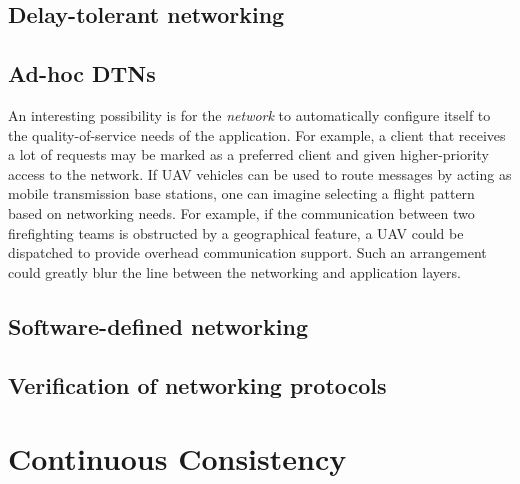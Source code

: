 \documentclass[]             %
{NASA}                       %
\theoremstyle{definition}
\begin{document}
\hypertarget{delay-tolerant-networking}{%
  \subsection{Delay-tolerant networking}\label{delay-tolerant-networking}}

\hypertarget{ad-hoc-dtns}{%
  \subsection{Ad-hoc DTNs}\label{ad-hoc-dtns}}

An interesting possibility is for the \emph{network} to automatically
configure itself to the quality-of-service needs of the application. For
example, a client that receives a lot of requests may be marked as a
preferred client and given higher-priority access to the network. If UAV
vehicles can be used to route messages by acting as mobile transmission
base stations, one can imagine selecting a flight pattern based on
networking needs. For example, if the communication between two
firefighting teams is obstructed by a geographical feature, a UAV could
be dispatched to provide overhead communication support. Such an
arrangement could greatly blur the line between the networking and
application layers.

\hypertarget{software-defined-networking}{%
  \subsection{Software-defined
    networking}\label{software-defined-networking}}

\hypertarget{verification-of-networking-protocols}{%
  \subsection{Verification of networking
    protocols}\label{verification-of-networking-protocols}}

\newpage

\hypertarget{continuous-consistency}{%
  \section{Continuous Consistency}\label{continuous-consistency}}

\label{sec:continuous-consistency}


\end{document}
